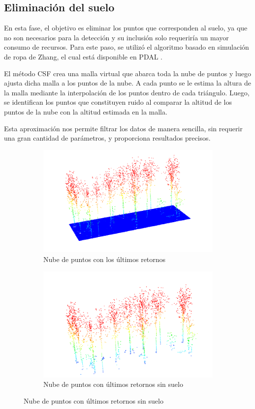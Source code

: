 \subsection{Eliminación del suelo}
\label{chap:groundAlgo}
En esta fase, el objetivo es eliminar los puntos que corresponden al suelo, ya que no son necesarios para la detección y su inclusión solo requeriría un mayor consumo de recursos. Para este paso, se utilizó el algoritmo basado en simulación de ropa de Zhang, el cual está disponible en PDAL \cite{rs8060501}.

El método CSF crea una malla virtual que abarca toda la nube de puntos y luego ajusta dicha malla a los puntos de la nube. A cada punto se le estima la altura de la malla mediante la interpolación de los puntos dentro de cada triángulo. Luego, se identifican los puntos que constituyen ruido al comparar la altitud de los puntos de la nube con la altitud estimada en la malla.

Esta aproximación nos permite filtrar los datos de manera sencilla, sin requerir una gran cantidad de parámetros, y proporciona resultados precisos.

\begin{figure}
  \begin{subfigure}{0.5\textwidth}
    \centering
    \includegraphics[width=0.8\linewidth]{imaxes/last.png}
    \caption{Nube de puntos con los últimos retornos}
    \label{fig:last1}
  \end{subfigure}%
  \begin{subfigure}{0.5\textwidth}
    \centering
    \includegraphics[width=0.8\linewidth]{imaxes/lastnog.png}
    \caption{Nube de puntos con últimos retornos sin suelo}
    \label{fig:last}
  \end{subfigure}
  \label{fig:algo2}
\end{figure}



